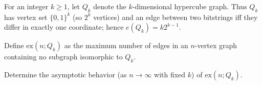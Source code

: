 For an integer $k\ge 1$, let $Q_k$ denote the $k$-dimensional hypercube graph.
Thus $Q_k$ has vertex set $\{0,1\}^k$ (so $2^k$ vertices) and an edge between two bitstrings iff they differ in exactly one coordinate; hence $e(Q_k)=k2^{k-1}$.

Define $\mathrm{ex}(n;Q_k)$ as the maximum number of edges in an $n$-vertex graph containing no subgraph isomorphic to $Q_k$.

Determine the asymptotic behavior (as $n\to\infty$ with fixed $k$) of $\mathrm{ex}(n;Q_k)$.
